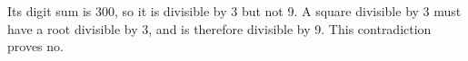Its digit sum is 300, so it is divisible by 3 but not 9. A square divisible by 3 must have a root divisible by 3, and is therefore divisible by 9. This contradiction proves $\boxed{\text{no}}$.
